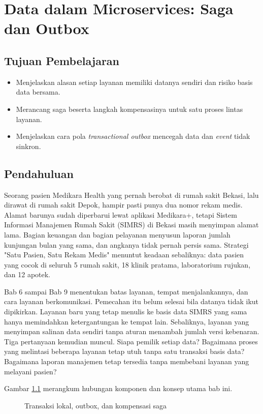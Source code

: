 \chapter{Data dalam Microservices: Saga dan Outbox}
\label{ch:ch10}

\section*{Tujuan Pembelajaran}
\begin{itemize}
  \item Menjelaskan alasan setiap layanan memiliki datanya sendiri dan risiko basis data bersama.
  \item Merancang saga beserta langkah kompensasinya untuk satu proses lintas layanan.
  \item Menjelaskan cara pola \textit{transactional outbox} mencegah data dan \textit{event} tidak sinkron.
\end{itemize}

\section{Pendahuluan}

Seorang pasien Medikara Health yang pernah berobat di rumah sakit Bekasi, lalu dirawat di rumah sakit
Depok, hampir pasti punya dua nomor rekam medis. Alamat barunya sudah diperbarui lewat aplikasi
Medikara+, tetapi Sistem Informasi Manajemen Rumah Sakit (SIMRS) di Bekasi masih menyimpan alamat
lama. Bagian keuangan dan bagian pelayanan menyusun laporan jumlah kunjungan bulan yang sama, dan
angkanya tidak pernah persis sama. Strategi "Satu Pasien, Satu Rekam Medis" menuntut keadaan
sebaliknya: data pasien yang cocok di seluruh 5 rumah sakit, 18 klinik pratama, laboratorium
rujukan, dan 12 apotek.

Bab 6 sampai Bab 9 menentukan batas layanan, tempat menjalankannya, dan cara layanan berkomunikasi.
Pemecahan itu belum selesai bila datanya tidak ikut dipikirkan. Layanan baru yang tetap menulis ke basis data
SIMRS yang sama hanya memindahkan ketergantungan ke tempat lain. Sebaliknya, layanan yang menyimpan
salinan data sendiri tanpa aturan menambah jumlah versi kebenaran. Tiga pertanyaan kemudian muncul.
Siapa pemilik setiap data? Bagaimana proses yang melintasi beberapa layanan tetap utuh tanpa satu
transaksi basis data? Bagaimana laporan manajemen tetap tersedia tanpa membebani layanan yang
melayani pasien?

Gambar \ref{fig:ch10-lemari-arsip} merangkum hubungan komponen dan konsep utama bab ini.
\begin{figure}[!htb]
  \centering
  
  \caption{Transaksi lokal, outbox, dan kompensasi saga}
  \label{fig:ch10-lemari-arsip}
\end{figure}

